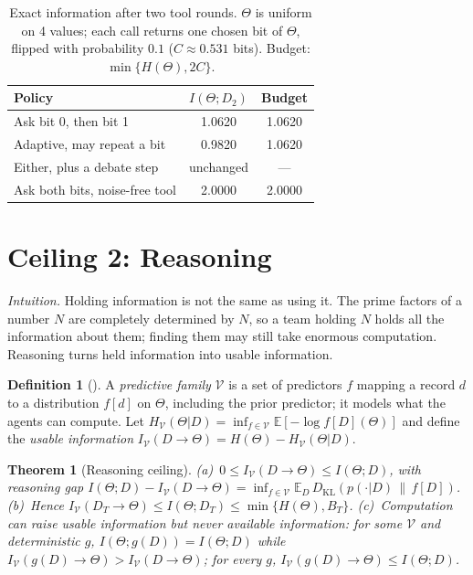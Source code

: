 \documentclass[conference]{IEEEtran}
\newtheorem{theorem}{Theorem}
\theoremstyle{definition}
\newtheorem{definition}{Definition}
\newcommand{\I}{I}
\newcommand{\Hh}{H}
\newcommand{\KL}{D_{\mathrm{KL}}}
\newcommand{\E}{\mathbb{E}}
\newcommand{\V}{\mathcal V}
\newcommand{\intuition}[1]{\noindent\textit{Intuition.} #1}
\begin{document}
\begin{table}[t]
\caption{Exact information after two tool rounds. $\Theta$ is uniform on 4
values; each call returns one chosen bit of $\Theta$, flipped with probability
$0.1$ ($C\approx0.531$ bits). Budget: $\min\{\Hh(\Theta),2C\}$.}
\label{tab:tight}
\centering
\begin{tabular}{@{}lcc@{}}
\toprule
Policy & $\I(\Theta;D_2)$ & Budget \\
\midrule
Ask bit 0, then bit 1 & 1.0620 & 1.0620 \\
Adaptive, may repeat a bit & 0.9820 & 1.0620 \\
Either, plus a debate step & unchanged & --- \\
Ask both bits, noise-free tool & 2.0000 & 2.0000 \\
\bottomrule
\end{tabular}
\end{table}

\section{Ceiling 2: Reasoning}\label{sec:reasoning}

\intuition{Holding information is not the same as using it. The prime factors
of a number $N$ are completely determined by $N$, so a team holding $N$ holds
all the information about them; finding them may still take enormous
computation. Reasoning turns held information into usable information.}

\begin{definition}[\cite{xu2020}]
A \emph{predictive family} $\V$ is a set of predictors $f$ mapping a record $d$
to a distribution $f[d]$ on $\Theta$, including the prior predictor; it models
what the agents can compute. Let
$\Hh_\V(\Theta|D)=\inf_{f\in\V}\E[-\log f[D](\Theta)]$ and define the
\emph{usable information} $\I_\V(D\to\Theta)=\Hh(\Theta)-\Hh_\V(\Theta|D)$.
\end{definition}

\begin{theorem}[Reasoning ceiling]\label{thm:reasoning}
(a)~$0\le\I_\V(D\to\Theta)\le\I(\Theta;D)$, with \emph{reasoning gap}
$\I(\Theta;D)-\I_\V(D\to\Theta)=\inf_{f\in\V}\E_D\,\KL(p(\cdot|D)\,\|\,f[D])$.
(b)~Hence $\I_\V(D_T\to\Theta)\le\I(\Theta;D_T)\le\min\{\Hh(\Theta),B_T\}$.
(c)~Computation can raise usable information but never available information:
for some $\V$ and deterministic $g$, $\I(\Theta;g(D))=\I(\Theta;D)$ while
$\I_\V(g(D)\to\Theta)>\I_\V(D\to\Theta)$; for every $g$,
$\I_\V(g(D)\to\Theta)\le\I(\Theta;D)$.
\end{theorem}
\end{document}
